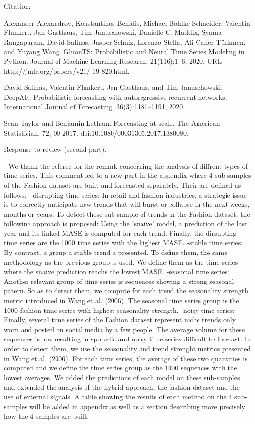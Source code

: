 \documentclass[10pt]{article} %
\begin{document}
Citation:

Alexander Alexandrov, Konstantinos Benidis, Michael Bohlke-Schneider, Valentin Flunkert, Jan Gasthaus, Tim Januschowski, Danielle C. Maddix, Syama Rangapuram, David Salinas, Jasper Schulz, Lorenzo Stella, Ali Caner Türkmen, and Yuyang Wang. GluonTS: Probabilistic and Neural Time Series Modeling in Python. Journal of Machine Learning Research, 21(116):1–6, 2020. URL http://jmlr.org/papers/v21/
19-820.html.

David Salinas, Valentin Flunkert, Jan Gasthaus, and Tim Januschowski. DeepAR: Probabilistic forecasting with autoregressive recurrent networks. International Journal of Forecasting, 36(3):1181–1191, 2020.

Sean Taylor and Benjamin Letham. Forecasting at scale. The American Statistician, 72, 09 2017. doi:10.1080/00031305.2017.1380080.


Response to review (second part).\vspace{0.2cm}

	
- We thank the referee for the remark concerning the analysis of diffrent types of time series. This comment led to a new part in the appendix where 4 sub-samples of the Fashion dataset are built and forecasted separately.
Their are defined as follows:
	- disrupting time series: In retail and fashion industries, a strategic issue is to correctly anticipate new trends that will burst or collapse in the next weeks, months or years. To detect these sub sample of trends in the Fashion dataset, the following approach is proposed: Using the 'snaive' model, a prediction of the last year and its linked MASE is computed for each trend. Finally, the dirsupting time series are the 1000 time series with the highest MASE.
	-stable time series: By contrast, a group a stable trend a presented. To define them, the same methodology as the previous group is used. We define them as the time series where the snaive prediction reachs the lowest MASE. 
	-seasonal time series: Another relevant group of time series is sequences showing a strong seasonal patern. So as to detect them, we compute for each trend the seasonality strength metric introduced in Wang et al. (2006). The seasonal time series group is the 1000 fashion time series with highest seasonality strength.
	-noisy time series: Finally, several time series of the Fashion dataset represent niche trends only worn and posted on social media by a few people. The average volume for these sequences is low resulting in sporadic and noisy time series difficult to forecast. In order to detect them, we use the seasonality and trend strenght metrics presented in Wang et al. (2006). For each time series, the average of these two quantities is computed and we define the time series group as the 1000 sequences with the lowest averages.
We added the predictions of each model on these sub-samples and extended the analysis of the hybrid approach, the fashion dataset and the use of external signals. A table showing the results of each method on the 4 sub-samples will be added in appendix as well as a section describing more precisely how the 4 samples are built.
\end{document}
